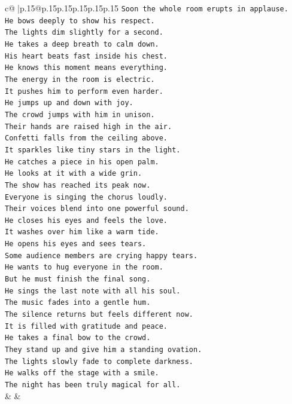 \documentclass{article}
\begin{document}
{\begin{supertabular}{c@{$\;$}|p{.15\linewidth}@{}p{.15\linewidth}p{.15\linewidth}p{.15\linewidth}p{.15\linewidth}p{.15\linewidth}}
{{{\texttt{Soon the whole room erupts in applause.} \\
\texttt{He bows deeply to show his respect.} \\
\texttt{The lights dim slightly for a second.} \\
\texttt{He takes a deep breath to calm down.} \\
\texttt{His heart beats fast inside his chest.} \\
\texttt{He knows this moment means everything.} \\
\texttt{The energy in the room is electric.} \\
\texttt{It pushes him to perform even harder.} \\
\texttt{He jumps up and down with joy.} \\
\texttt{The crowd jumps with him in unison.} \\
\texttt{Their hands are raised high in the air.} \\
\texttt{Confetti falls from the ceiling above.} \\
\texttt{It sparkles like tiny stars in the light.} \\
\texttt{He catches a piece in his open palm.} \\
\texttt{He looks at it with a wide grin.} \\
\texttt{The show has reached its peak now.} \\
\texttt{Everyone is singing the chorus loudly.} \\
\texttt{Their voices blend into one powerful sound.} \\
\texttt{He closes his eyes and feels the love.} \\
\texttt{It washes over him like a warm tide.} \\
\texttt{He opens his eyes and sees tears.} \\
\texttt{Some audience members are crying happy tears.} \\
\texttt{He wants to hug everyone in the room.} \\
\texttt{But he must finish the final song.} \\
\texttt{He sings the last note with all his soul.} \\
\texttt{The music fades into a gentle hum.} \\
\texttt{The silence returns but feels different now.} \\
\texttt{It is filled with gratitude and peace.} \\
\texttt{He takes a final bow to the crowd.} \\
\texttt{They stand up and give him a standing ovation.} \\
\texttt{The lights slowly fade to complete darkness.} \\
\texttt{He walks off the stage with a smile.} \\
\texttt{The night has been truly magical for all.} \\
            }
        }
    }
    & & \\ \\


\end{supertabular}}
\end{document}
